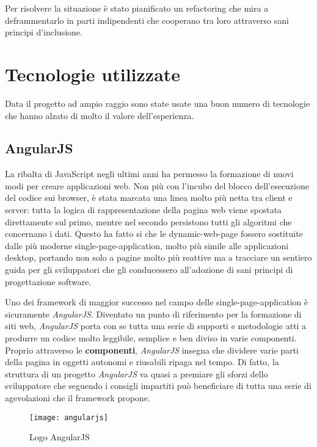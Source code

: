 Per risolvere la situazione è stato pianificato un \gls{refactoring} che mira
a deframmentarlo in parti indipendenti che cooperano tra loro attraverso
sani principi d'inclusione.

\section{Tecnologie utilizzate}
Data il progetto ad ampio raggio sono state usate una buon numero di tecnologie
che hanno alzato di molto il valore dell'esperienza.

\subsection{AngularJS}
La ribalta di JavaScript negli ultimi anni ha permesso la formazione di
nuovi modi per creare applicazioni web. Non più con l'incubo del blocco
dell'esecuzione del codice sui browser, è stata marcata una linea molto più
netta tra client e server: tutta la logica di rappresentazione della pagina web
viene spostata direttamente sul primo, mentre nel secondo persistono tutti
gli algoritmi che concernano i dati. Questo ha fatto si che le
\gls{dynamic-web-page} fossero sostituite dalle più moderne
\gls{single-page-application}, molto più simile alle applicazioni desktop,
portando non solo a pagine molto più reattive ma a tracciare un sentiero guida
per gli sviluppatori che gli conducessero all'adozione di sani principi di
progettazione software.

Uno dei framework di maggior successo nel campo delle
\gls{single-page-application} è sicuramente \textit{AngularJS}. Diventato un
punto di riferimento per la formazione di siti web, \textit{AngularJS} porta
con se tutta una serie di supporti e metodologie atti a produrre un codice molto
leggibile, semplice e ben diviso in varie componenti. Proprio attraverso le
\textbf{componenti}, \textit{AngularJS} insegna che dividere varie parti della
pagina in oggetti autonomi e riusabili ripaga nel tempo. Di fatto, la struttura
di un progetto \textit{AngularJS} va quasi a premiare gli sforzi dello
sviluppatore che seguendo i consigli impartiti può beneficiare di tutta una
serie di agevolazioni che il framework propone.

\begin{figure}[H]
\begin{center}
\texttt{[image: angularjs]}
\caption{Logo AngularJS}
\label{fig:angularjs_logo}
\end{center}
\end{figure}

